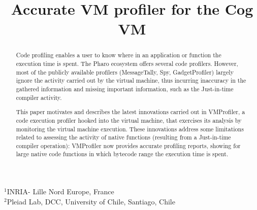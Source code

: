 \documentclass[10pt,preprint,nonatbib]{sigplanconf}
\newcommand{\Title}{Accurate VM profiler for the Cog VM}
\newcommand{\Authors}{Sophie Kaleba, Cl\'ement B\'era, Alexandre Bergel$^3$\\[2 ex]
$^3$Pleiad Lab, DCC, University of Chile}
\begin{document}
\setlength{\pdfpageheight}{\paperheight}
\setlength{\pdfpagewidth}{\paperwidth}



\title{\Title}


           {$^1$INRIA- Lille Nord Europe, France\\
             $^2$Pleiad Lab, DCC, University of Chile, Santiago, Chile}
           {}


\maketitle

\begin{abstract}

Code profiling enables a user to know where in an application or function the execution time is spent. The Pharo ecosystem offers several code profilers. However, most of the publicly available profilers (MessageTally, Spy, GadgetProfiler) largely ignore the activity carried out by the virtual machine, thus incurring inaccuracy in the gathered information and missing important information, such as the Just-in-time compiler activity.

This paper motivates and describes the latest innovations carried out in VMProfiler, a code execution profiler hooked into the virtual machine, that exercises its analysis by monitoring the virtual machine execution. These innovations address some limitations related to assessing the activity of native functions (resulting from a Just-in-time compiler operation): VMProfiler now provides accurate profiling reports, showing for large native code functions in which bytecode range the execution time is spent.

%
%

\end{abstract}
\end{document}
